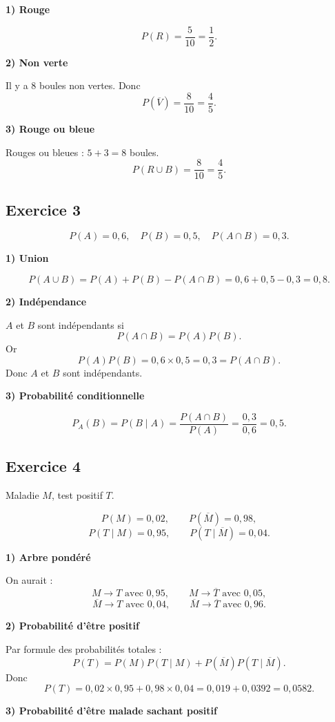 \documentclass[11pt,a4paper]{article}
\begin{document}
\textbf{1) Rouge}

\[
P(R)=\frac{5}{10}=\frac12.
\]

\textbf{2) Non verte}

Il y a \(8\) boules non vertes. Donc
\[
P(\overline{V})=\frac{8}{10}=\frac45.
\]

\textbf{3) Rouge ou bleue}

Rouges ou bleues : \(5+3=8\) boules.
\[
P(R\cup B)=\frac{8}{10}=\frac45.
\]

\subsection*{Exercice 3}
\[
P(A)=0{,}6,\quad P(B)=0{,}5,\quad P(A\cap B)=0{,}3.
\]

\textbf{1) Union}

\[
P(A\cup B)=P(A)+P(B)-P(A\cap B)=0{,}6+0{,}5-0{,}3=0{,}8.
\]

\textbf{2) Indépendance}

\(A\) et \(B\) sont indépendants si
\[
P(A\cap B)=P(A)P(B).
\]
Or
\[
P(A)P(B)=0{,}6\times 0{,}5=0{,}3=P(A\cap B).
\]
Donc \(A\) et \(B\) sont indépendants.

\textbf{3) Probabilité conditionnelle}

\[
P_A(B)=P(B\mid A)=\frac{P(A\cap B)}{P(A)}=\frac{0{,}3}{0{,}6}=0{,}5.
\]

\subsection*{Exercice 4}
Maladie \(M\), test positif \(T\).

\[
P(M)=0{,}02,\qquad P(\overline M)=0{,}98,
\]
\[
P(T\mid M)=0{,}95,\qquad P(T\mid \overline M)=0{,}04.
\]

\textbf{1) Arbre pondéré}

On aurait :
\[
M \to T \text{ avec } 0{,}95,\qquad M \to \overline T \text{ avec } 0{,}05,
\]
\[
\overline M \to T \text{ avec } 0{,}04,\qquad \overline M \to \overline T \text{ avec } 0{,}96.
\]

\textbf{2) Probabilité d'être positif}

Par formule des probabilités totales :
\[
P(T)=P(M)P(T\mid M)+P(\overline M)P(T\mid \overline M).
\]
Donc
\[
P(T)=0{,}02\times 0{,}95+0{,}98\times 0{,}04=0{,}019+0{,}0392=0{,}0582.
\]

\textbf{3) Probabilité d'être malade sachant positif}
\end{document}
